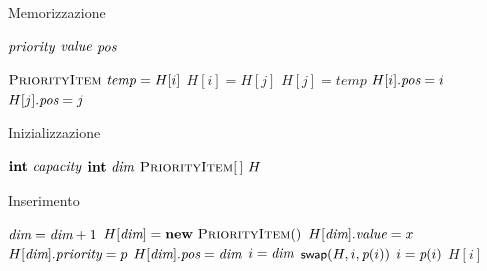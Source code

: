 \begin{frame}{Memorizzazione}

\vspace{-9pt}
\begin{Procedure}
\caption[A]{\PriorityItem}

\INTEGER $\textit{priority}$
\Item $\textit{value}$
\INTEGER $\textit{pos}$

\end{Procedure}

\begin{Procedure}
\caption[A]{\Swap($\PriorityItem[\,]$ $H$, \INTEGER $i$, \INTEGER $j$)}

$\textsc{PriorityItem}\ \mathit{temp} = H[i]$\;
$H[i] = H[j]$\;
$H[j] = \mathit{temp}$\;
$H[i].\textit{pos} = i$\;
$H[j].\textit{pos} = j$\;

\end{Procedure}

\end{frame}

\begin{frame}{Inizializzazione}
    
\vspace{-9pt}
\begin{Procedure}
\caption[A]{\Heap}
$\INTEGER\ \heapsize$
$\INTEGER\ \heapcount$
$\textsc{PriorityItem}[\,]\ H$
\BlankLine

\end{Procedure}

\end{frame}

\begin{frame}{Inserimento}

\vspace{-9pt}
\begin{Procedure}
\caption[A]{\PriorityItem\ \heapinsert(\Item $x$, \INTEGER\ $p$)}
\precondition{$\heapcount < \heapsize$}
\BlankLine
$\textit{dim} = \textit{dim}+1$\;
$H[\heapcount] = \NEW\ \PriorityItem()$\;
$H[\textit{dim}].\textit{value} = x$\;
$H[\textit{dim}].\textit{priority} = p$\;
$H[\textit{dim}].\textit{pos} = \textit{dim}$\;
\INTEGER $i = \textit{dim}$\;
{
  $\textsf{{\small swap}}(H, i, \textit{p}(i))$\;
  $i = \textit{p}(i)$\;
}
\Return $H[i]$\;
\end{Procedure}


\end{frame}


